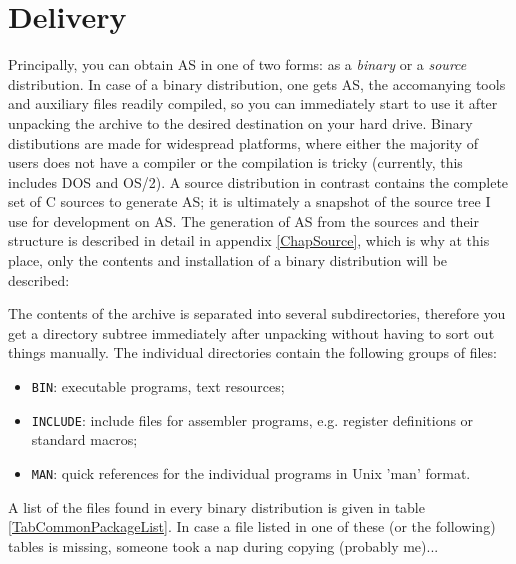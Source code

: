 \documentclass[12pt,twoside]{report}
\begin{document}

\section{Delivery}

Principally, you can obtain AS in one of two forms: as a {\em binary} or a
{\em source} distribution.  In case of a binary distribution, one gets AS,
the accomanying tools and auxiliary files readily compiled, so you can
immediately start to use it after unpacking the archive to the desired
destination on your hard drive.
Binary distibutions are made for widespread platforms, where either the
majority of users does not have a compiler or the compilation is tricky
(currently, this includes DOS and OS/2).  A source distribution in
contrast contains the complete set of C sources to generate AS; it is
ultimately a snapshot of the source tree I use for development on AS.  The
generation of AS from the sources and their structure is described in
detail in appendix \ref{ChapSource}, which is why at this place, only the
contents and installation of a binary distribution will be described:

The contents of the archive is separated into several subdirectories,
therefore you get a directory subtree immediately after unpacking without
having to sort out things manually.  The individual directories contain
the following groups of files:
\begin{itemize}
\item{{\tt BIN}: executable programs, text resources;}
\item{{\tt INCLUDE}: include files for assembler programs, e.g. register
      definitions or standard macros;}
\item{{\tt MAN}: quick references for the individual programs in Unix
      'man' format.}
\end{itemize}
A list of the files found in every binary distribution is given in table
\ref{TabCommonPackageList}.  In case a file listed in one of these (or the
following) tables is missing, someone took a nap during copying (probably
me)...
\end{document}
